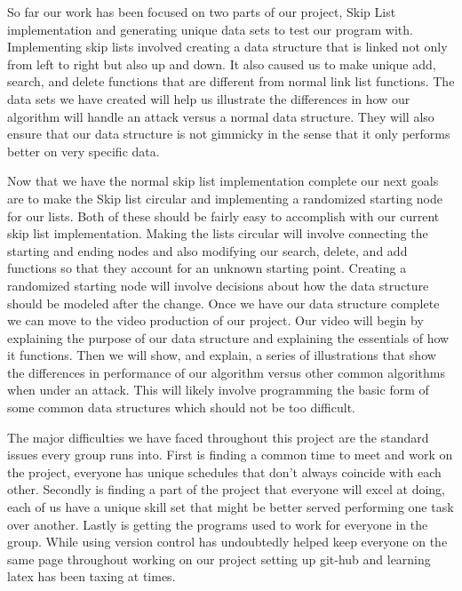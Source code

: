 So far our work has been focused on two parts of our project, Skip List implementation and generating unique data sets to test our program with. Implementing skip lists involved creating a data structure that is linked not only from left to right but also up and down. It also caused us to make unique add, search, and delete functions that are different from normal link list functions. The data sets we have created will help us illustrate the differences in how our algorithm will handle an attack versus a normal data structure. They will also ensure that our data structure is not gimmicky in the sense that it only performs better on very specific data.

Now that we have the normal skip list implementation complete our next goals are to make the Skip list circular and implementing a randomized starting node for our lists. Both of these should be fairly easy to accomplish with our current skip list implementation. Making the lists circular will involve connecting the starting and ending nodes and also modifying our search, delete, and add functions so that they account for an unknown starting point. Creating a randomized starting node will involve decisions about how the data structure should be modeled after the change. Once we have our data structure complete we can move to the video production of our project. Our video will begin by explaining the purpose of our data structure and explaining the essentials of how it functions. Then we will show, and explain, a series of illustrations that show the differences in performance of our algorithm versus other common algorithms when under an attack. This will likely involve programming the basic form of some common data structures which should not be too difficult.

The major difficulties we have faced throughout this project are the standard issues every group runs into. First is finding a common time to meet and work on the project, everyone has unique schedules that don't always coincide with each other. Secondly is finding a part of the project that everyone will excel at doing, each of us have a unique skill set that might be better served performing one task over another. Lastly is getting the programs used to work for everyone in the group. While using version control has undoubtedly helped keep everyone on the same page throughout working on our project setting up git-hub and learning latex has been taxing at times.
